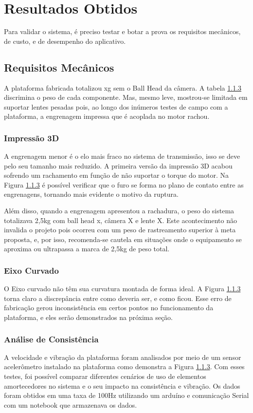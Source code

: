 \chapter{Resultados Obtidos}

Para validar o sistema, é preciso testar e botar a prova os requisitos mecânicos, de custo, e de desempenho do aplicativo. 

\section{Requisitos Mecânicos}

A plataforma fabricada totalizou xg sem o Ball Head da câmera. A tabela \ref{} discrimina o peso de cada componente. Mas, mesmo leve, mostrou-se limitada em suportar lentes pesadas pois, ao longo dos inúmeros testes de campo com a plataforma, a engrenagem impressa que é acoplada no motor rachou. 

\subsection{Impressão 3D}
A engrenagem menor é o elo mais fraco no sistema de transmissão, isso se deve pelo seu tamanho mais reduzido. A primeira versão da impressão 3D acabou sofrendo um rachamento em função de não suportar o torque do motor. Na Figura \ref{} é possível verificar que o furo se forma no plano de contato entre as engrenagens, tornando mais evidente o motivo da ruptura.

Além disso, quando a engrenagem apresentou a rachadura, o peso do sistema totalizava 2,5kg com ball head x, câmera X e lente X. Este acontecimento não invalida o projeto pois ocorreu com um peso de rastreamento superior à meta proposta, e, por isso, recomenda-se cautela em situações onde o equipamento se aproxima ou ultrapassa a marca de 2,5kg de peso total. 

 

\subsection{Eixo Curvado}

O Eixo curvado não têm sua curvatura montada de forma ideal. A Figura \ref{} torna claro a discrepância entre como deveria ser, e como ficou. Esse erro de fabricação gerou inconsistência em certos pontos no funcionamento da plataforma, e eles serão demonstrados na próxima seção.

\subsection{Análise de Consistência}
A velocidade e vibração da plataforma foram analisados por meio de um sensor acelerômetro instalado na plataforma como demonstra a Figura \ref{}. Com esses testes, foi possível comparar diferentes cenários de uso de elementos amortecedores no sistema e o seu impacto na consistência e vibração. Os dados foram obtidos em uma taxa de 100Hz utilizando um arduíno e comunicação Serial com um notebook que armazenava os dados. 


